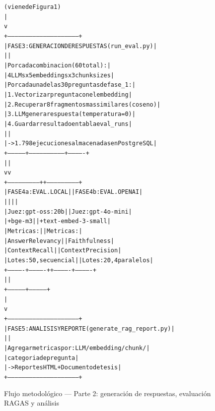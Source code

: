 \documentclass{article}
\begin{document}
\begin{figure}[H]
\centering
\begin{alltt}\small
                      (viene de Figura 1)
                              |
                              v
+------------------------------------------------------------+
| FASE 3: GENERACION DE RESPUESTAS (run_eval.py)            |
|                                                           |
|  Por cada combinacion (60 total):                        |
|    4 LLMs x 5 embeddings x 3 chunk sizes                |
|  Por cada una de las 30 preguntas de fase_1:             |
|    1. Vectorizar pregunta con el embedding               |
|    2. Recuperar 8 fragmentos mas similares (coseno)      |
|    3. LLM genera respuesta (temperatura=0)               |
|    4. Guardar resultado en tabla eval_runs               |
|                                                           |
|  -> 1.798 ejecuciones almacenadas en PostgreSQL          |
+---------------+-----------------------------+-------------+
                |                             |
                v                             v
+---------------------------+   +---------------------------+
| FASE 4a: EVAL. LOCAL      |   | FASE 4b: EVAL. OPENAI     |
|                           |   |                           |
| Juez: gpt-oss:20b         |   | Juez: gpt-4o-mini         |
|       + bge-m3            |   |   + text-embed-3-small    |
| Metricas:                 |   | Metricas:                 |
|   Answer Relevancy        |   |   Faithfulness            |
|   Context Recall          |   |   Context Precision       |
| Lotes: 50, secuencial     |   | Lotes: 20, 4 paralelos   |
+-------------+-------------+   +-------------+-------------+
              |                               |
              +---------------+---------------+
                              |
                              v
+------------------------------------------------------------+
| FASE 5: ANALISIS Y REPORTE (generate_rag_report.py)       |
|                                                           |
|  Agregar metricas por: LLM / embedding / chunk /         |
|  categoria de pregunta                                    |
|  -> Reportes HTML + Documento de tesis                   |
+------------------------------------------------------------+
\end{alltt}
\caption{Flujo metodológico — Parte 2: generación de respuestas, evaluación RAGAS y análisis}
\label{fig:flujo_b}
\end{figure}
\end{document}
